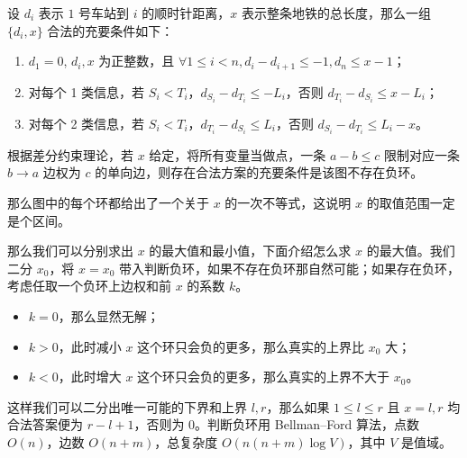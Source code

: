 \documentclass[12pt,a4paper,oneside]{article}
\begin{document}
设 $d_i$ 表示 $1$ 号车站到 $i$ 的顺时针距离，$x$ 表示整条地铁的总长度，那么一组 $\{d_i,x\}$ 合法的充要条件如下：

\begin{enumerate}
  \item $d_1=0$, $d_i,x$ 为正整数，且 $\forall 1 \le i < n,d_{i}-d_{i+1} \le -1,d_n \le x-1$；
  \item 对每个 1 类信息，若 $S_i < T_i$，$d_{S_i}-d_{T_i} \le -L_i$，否则 $d_{T_i}-d_{S_i} \le x-L_i$；
  \item 对每个 2 类信息，若 $S_i < T_i$，$d_{T_i}-d_{S_i} \le L_i$，否则 $d_{S_i}-d_{T_i} \le L_i-x$。
\end{enumerate}

根据差分约束理论，若 $x$ 给定，将所有变量当做点，一条 $a-b \le c$ 限制对应一条 $b \to a$ 边权为 $c$ 的单向边，则存在合法方案的充要条件是该图不存在负环。

那么图中的每个环都给出了一个关于 $x$ 的一次不等式，这说明 $x$ 的取值范围一定是个区间。

那么我们可以分别求出 $x$ 的最大值和最小值，下面介绍怎么求 $x$ 的最大值。我们二分 $x_0$，将 $x=x_0$ 带入判断负环，如果不存在负环那自然可能；如果存在负环，考虑任取一个负环上边权和前 $x$ 的系数 $k$。

\begin{itemize}
  \item $k=0$，那么显然无解；
  \item $k>0$，此时减小 $x$ 这个环只会负的更多，那么真实的上界比 $x_0$ 大；
  \item $k<0$，此时增大 $x$ 这个环只会负的更多，那么真实的上界不大于 $x_0$。
\end{itemize}

这样我们可以二分出唯一可能的下界和上界 $l,r$，那么如果 $1 \le l \le r$ 且 $x=l,r$ 均合法答案便为 $r-l+1$，否则为 $0$。判断负环用 Bellman–Ford 算法，点数 $O(n)$，边数 $O(n+m)$，总复杂度 $O(n(n+m) \log V)$，其中 $V$ 是值域。
\end{document}

